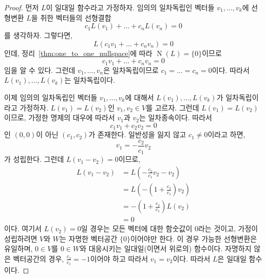 \documentclass[unfonts,oneside,a4paper]{oblivoir}
\theoremstyle{definition}
\theoremstyle{theorem}
\theoremstyle{theorem}
\theoremstyle{remark}
\theoremstyle{remark}
\theoremstyle{remark}
\theoremstyle{remark}
\renewcommand{\vec}[1]{\bm{\mathit{#1}}}
\newcommand{\vecz}{\bm{\mathrm{0}}}
\DeclareMathOperator{\Null}{N}
\begin{document}
\begin{proof}
    먼저 $L$이 일대일 함수라고 가정하자.
    임의의 일차독립인 벡터들 $\vec v_1, \dots, \vec v_k$에 선형변환 $L$을 취한 벡터들의 선형결합
    \begin{equation*}
        c_1 L(\vec v_1) + \dots + c_n L(\vec v_n) = \vecz
    \end{equation*}
    를 생각하자.
    그렇다면,
    \begin{equation*}
        L(c_1 \vec v_1 + \dots + c_n \vec v_n) = \vecz
    \end{equation*}
    인데, 정리~\ref{thm:one_to_one_nullspace}에 따라 $\Null(L) = \{\vecz\}$이므로
    \begin{equation*}
        c_1 \vec v_1 + \dots + c_n \vec v_n = \vecz
    \end{equation*}
    임을 알 수 있다.
    그런데 $\vec v_1, \dots, \vec v_n$은 일차독립이므로 $c_1 = \dots = c_n = 0$이다.
    따라서 $L(\vec v_1), \dots, L(\vec v_k)$는 일차독립이다.

    이제 임의의 일차독립인 벡터들 $\vec v_1, \dots, \vec v_k$에 대해서 $L(\vec v_1), \dots, L(\vec v_k)$가 일차독립이라고 가정하자.
    $L(\vec v_1) = L(\vec v_2)$인 $\vec v_1, \vec v_2 \in V$를 고르자.
    그런데 $L(\vec v_1) = L(\vec v_2)$이므로, 가정한 명제의 대우에 따라서 $\vec v_1$과 $\vec v_2$는 일차종속이다.
    따라서
    \begin{equation*}
        c_1 \vec v_1 + c_2 \vec v_2 = \vecz
    \end{equation*}
    인 $(0, 0)$이 아닌 $(c_1, c_2)$가 존재한다.
    일반성을 잃지 않고 $c_1 \neq 0$이라고 하면,
    \begin{equation*}
        \vec v_1 = - \frac{c_2}{c_1} \vec v_2
    \end{equation*}
    가 성립한다.
    그런데 $L(\vec v_1 - \vec v_2) = \vecz$이므로,
    \begin{align*}
        L(\vec v_1 - \vec v_2) &= L\left(-\frac{c_2}{c_1} \vec v_2 - \vec v_2\right)\\
                             &= L\left(-\left(1 + \frac{c_2}{c_1}\right) \vec v_2\right)\\
                             &= -\left(1 + \frac{c_2}{c_1}\right) L(\vec v_2)\\
                             &= \vecz
    \end{align*}
    이다.
    여기서 $L(\vec v_2) = \vecz$일 경우는 모든 벡터에 대한 함숫값이 $\vecz$라는 것이고, 가정이 성립하려면 $V$와 $W$는 자명한 벡터공간 $\{\vecz\}$이어야만 한다.
    이 경우 가능한 선형변환은 유일하며, $\vecz \in V$를 $\vecz \in W$와 대응시키는 일대일(이면서 위로의) 함수이다.
    자명하지 않은 벡터공간의 경우, $\frac{c_2}{c_1} = -1$이어야 하고 따라서 $\vec v_1 = \vec v_2$이다.
    따라서 $L$은 일대일 함수이다.
\end{proof}
\end{document}
